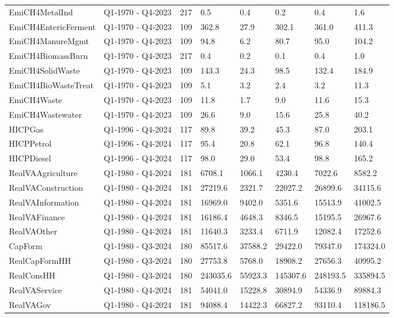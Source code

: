 \begin{longtable}[t]{llllllll}
EmiCH4MetalInd & Q1-1970 - Q4-2023 & 217 & 0.5 & 0.4 & 0.2 & 0.4 & 1.6\\
EmiCH4EntericFerment & Q1-1970 - Q4-2023 & 109 & 362.8 & 27.9 & 302.1 & 361.0 & 411.3\\
\addlinespace
EmiCH4ManureMgmt & Q1-1970 - Q4-2023 & 109 & 94.8 & 6.2 & 80.7 & 95.0 & 104.2\\
EmiCH4BiomassBurn & Q1-1970 - Q4-2023 & 217 & 0.4 & 0.2 & 0.1 & 0.4 & 1.0\\
EmiCH4SolidWaste & Q1-1970 - Q4-2023 & 109 & 143.3 & 24.3 & 98.5 & 132.4 & 184.9\\
EmiCH4BioWasteTreat & Q1-1970 - Q4-2023 & 109 & 5.1 & 3.2 & 2.4 & 3.2 & 11.3\\
EmiCH4Waste & Q1-1970 - Q4-2023 & 109 & 11.8 & 1.7 & 9.0 & 11.6 & 15.3\\
\addlinespace
EmiCH4Wastewater & Q1-1970 - Q4-2023 & 109 & 26.6 & 9.0 & 15.6 & 25.8 & 40.2\\
HICPGas & Q1-1996 - Q4-2024 & 117 & 89.8 & 39.2 & 45.3 & 87.0 & 203.1\\
HICPPetrol & Q1-1996 - Q4-2024 & 117 & 95.4 & 20.8 & 62.1 & 96.8 & 140.4\\
HICPDiesel & Q1-1996 - Q4-2024 & 117 & 98.0 & 29.0 & 53.4 & 98.8 & 165.2\\
RealVAAgriculture & Q1-1980 - Q4-2024 & 181 & 6708.1 & 1066.1 & 4230.4 & 7022.6 & 8582.2\\
\addlinespace
RealVAConstruction & Q1-1980 - Q4-2024 & 181 & 27219.6 & 2321.7 & 22027.2 & 26899.6 & 34115.6\\
RealVAInformation & Q1-1980 - Q4-2024 & 181 & 16969.0 & 9402.0 & 5351.6 & 15513.9 & 41002.5\\
RealVAFinance & Q1-1980 - Q4-2024 & 181 & 16186.4 & 4648.3 & 8346.5 & 15195.5 & 26967.6\\
RealVAOther & Q1-1980 - Q4-2024 & 181 & 11640.3 & 3233.4 & 6711.9 & 12082.4 & 17252.6\\
CapForm & Q1-1980 - Q3-2024 & 180 & 85517.6 & 37588.2 & 29422.0 & 79347.0 & 174324.0\\
\addlinespace
RealCapFormHH & Q1-1980 - Q3-2024 & 180 & 27753.8 & 5768.0 & 18908.2 & 27656.3 & 40995.2\\
RealConsHH & Q1-1980 - Q3-2024 & 180 & 243035.6 & 55923.3 & 145307.6 & 248193.5 & 335894.5\\
RealVAService & Q1-1980 - Q4-2024 & 181 & 54041.0 & 15228.8 & 30894.9 & 54336.9 & 89884.3\\
RealVAGov & Q1-1980 - Q4-2024 & 181 & 94088.4 & 14422.3 & 66827.2 & 93110.4 & 118186.5\\

\end{longtable}
